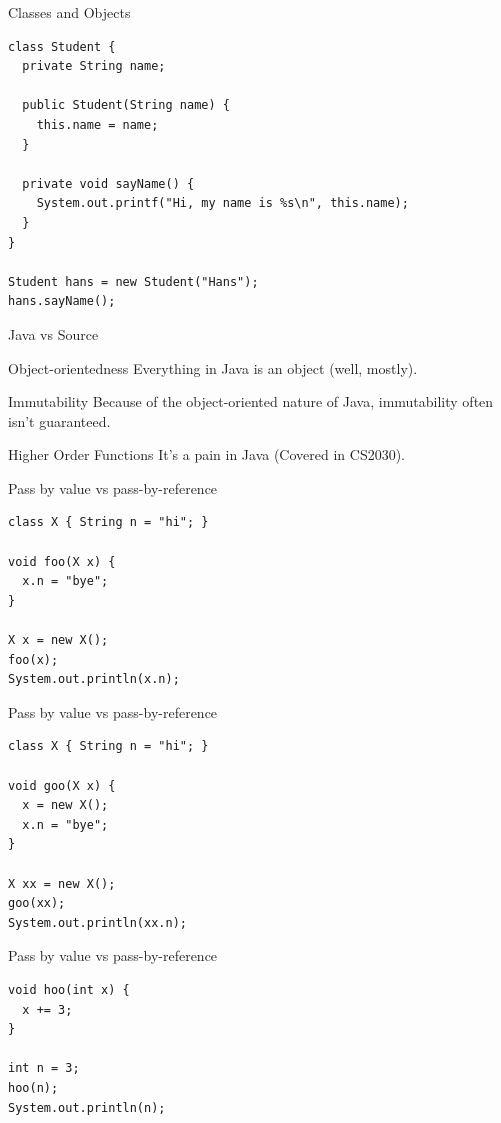 \documentclass[presentation]{beamer}
\begin{document}
\begin{frame}[label={sec:org6f59d48},fragile]{Classes and Objects}
 \begin{verbatim}
class Student {
  private String name;

  public Student(String name) {
    this.name = name;
  }

  private void sayName() {
    System.out.printf("Hi, my name is %s\n", this.name);
  }
}

Student hans = new Student("Hans");
hans.sayName();
\end{verbatim}
\end{frame}
\begin{frame}[<+->][label={sec:org04728ef}]{Java vs Source}
\begin{block}{Object-orientedness}
Everything in Java is an object (well, mostly).
\end{block}
\begin{block}{Immutability}
Because of the object-oriented nature of Java, immutability
often isn't guaranteed.
\end{block}
\begin{block}{Higher Order Functions}
It's a pain in Java (Covered in CS2030).
\end{block}
\end{frame}
\begin{frame}[label={sec:orgaac7719},fragile]{Pass by value vs pass-by-reference}
 \begin{verbatim}
class X { String n = "hi"; }

void foo(X x) {
  x.n = "bye";
}

X x = new X();
foo(x);
System.out.println(x.n);
\end{verbatim}
\end{frame}
\begin{frame}[label={sec:org6d97732},fragile]{Pass by value vs pass-by-reference}
 \begin{verbatim}
class X { String n = "hi"; }

void goo(X x) {
  x = new X();
  x.n = "bye";
}

X xx = new X();
goo(xx);
System.out.println(xx.n);
\end{verbatim}
\end{frame}
\begin{frame}[label={sec:org5b6c2b1},fragile]{Pass by value vs pass-by-reference}
 \begin{verbatim}
void hoo(int x) {
  x += 3;
}

int n = 3;
hoo(n);
System.out.println(n);
\end{verbatim}
\end{frame}
\end{document}
